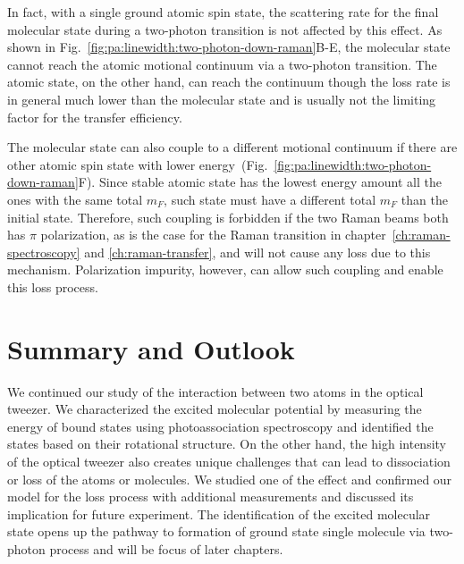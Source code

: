 In fact, with a single ground atomic spin state, the scattering rate for the final molecular
state during a two-photon transition is not affected by this effect.
As shown in Fig.~\ref{fig:pa:linewidth:two-photon-down-raman}B-E,
the molecular state cannot reach the atomic motional continuum via a two-photon transition.
The atomic state, on the other hand, can reach the continuum though the loss rate is in general
much lower than the molecular state
and is usually not the limiting factor for the transfer efficiency.

The molecular state can also couple to a different motional continuum if there are other
atomic spin state with lower energy~(Fig.~\ref{fig:pa:linewidth:two-photon-down-raman}F).
Since stable atomic state has the lowest energy amount all the ones with the same total $m_F$,
such state must have a different total $m_F$ than the initial state.
Therefore, such coupling is forbidden if the two Raman beams both has $\pi$ polarization,
as is the case for the Raman transition in chapter~\ref{ch:raman-spectroscopy}
and \ref{ch:raman-transfer}, and will not cause any loss due to this mechanism.
Polarization impurity, however, can allow such coupling and enable this loss process.

\section{Summary and Outlook}
\label{ch:pa:summary}
We continued our study of the interaction between two atoms in the optical tweezer.
We characterized the excited molecular potential by measuring
the energy of bound states using photoassociation spectroscopy
and identified the states based on their rotational structure.
On the other hand, the high intensity of the optical tweezer
also creates unique challenges that can lead to dissociation or loss of the atoms or molecules.
We studied one of the effect and confirmed our model for the loss process with
additional measurements and discussed its implication for future experiment.
The identification of the excited molecular state opens up the pathway
to formation of ground state single molecule via two-photon process
and will be focus of later chapters.
